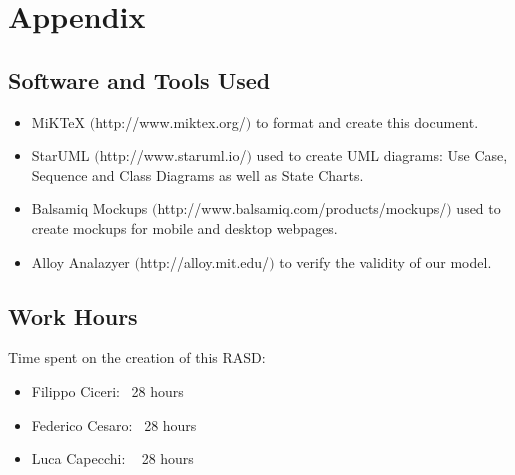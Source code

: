 \section{Appendix}

\subsection{Software and Tools Used}
\begin{itemize}
	\item MiKTeX $($http://www.miktex.org/$)$ to format and create this document.
	\item StarUML $($http://www.staruml.io/$)$ used to create UML diagrams: Use Case, Sequence and Class Diagrams as well as State Charts.
	\item Balsamiq Mockups $($http://www.balsamiq.com/products/mockups/$)$ used to create mockups for mobile and desktop webpages.
	\item Alloy Analazyer $($http://alloy.mit.edu/$)$ to verify the validity of our model.
\end{itemize}

\subsection{Work Hours}
	Time spent on the creation of this RASD:
	\begin{itemize}
	\item Filippo Ciceri: ~28 hours
	\item Federico Cesaro: ~28 hours
	\item Luca Capecchi: ~ 28 hours
	\end{itemize}

